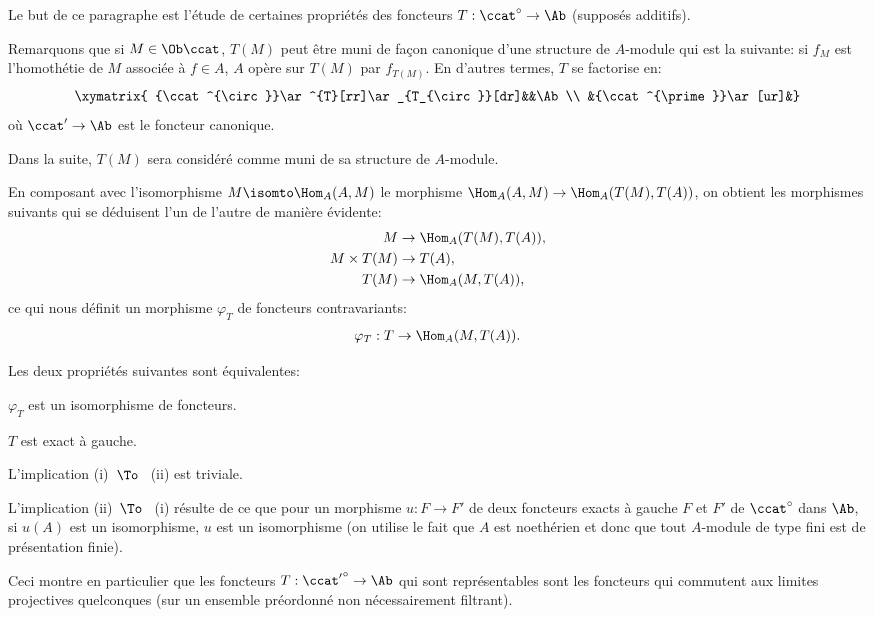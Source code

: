 \smallskip
Le but de ce paragraphe est l'\'etude de certaines propri\'et\'es des foncteurs \hbox{$T: \ccat^{\circ}\to \Ab$} (suppos\'es additifs).

Remarquons que si $M\in \Ob \ccat$, $T(M)$ peut \^etre muni de fa\c
con canonique d'une structure de $A$-module qui est la suivante:
si $f_{M}$ est l'homoth\'etie de $M$ associ\'ee \`a $f\in A$, $A$
op\`ere sur $T(M)$ par $f_{T(M)}$. En d'autres termes, $T$ se
factorise en:
$$
\xymatrix{ {\ccat^{\circ}}\ar^{T}[rr]\ar_{T_{\circ}}[dr]&&\Ab\\
&{\ccat^{\prime}}\ar[ur]&}
$$
o\`u $\ccat'\to \Ab$ est le foncteur canonique.

Dans la suite, $T(M)$ sera consid\'er\'e comme muni de sa structure de $A$-module.

En composant avec l'isomorphisme \hbox{$M\isomto \Hom_{A}(A, M)$} le morphisme $\Hom_{A}(A, M)\to \Hom_{A}(T(M), T(A))$, on obtient les morphismes suivants qui se d\'eduisent l'un de l'autre de mani\`ere \'evidente:
\begin{align*}
M&\to \Hom_{A}(T(M), T(A)),\\
M\times T(M)&\to T(A),\\
T(M)&\to \Hom_{A}(M, T(A)),
\end{align*}
ce qui nous d\'efinit un morphisme $\varphi_{T}$ de foncteurs contravariants:
\begin{eqnarray*}
\varphi_{T}: T\to \Hom_{A}(M, T(A)).
\end{eqnarray*}

\begin{proposition} \label{IV.1.1}
Les deux propri\'et\'es suivantes sont \'equivalentes:
\begin{enumeratei}
\item
$\varphi_{T}$ est un isomorphisme de foncteurs.

\item
$T$ est exact \`a gauche.
\end{enumeratei}
\end{proposition}

L'implication (i)~$\To$~ (ii) est triviale.

L'implication (ii)~$\To$~ (i) r\'esulte de ce que pour un morphisme $u:F\to F'$ de deux foncteurs \ignorespaces exacts \`a gauche $F$ et $F'$ de $\ccat^{\circ}$ dans $\Ab$, si $u(A)$ est un isomorphisme, $u$ est un isomorphisme (on utilise le fait que $A$ est noeth\'erien et donc que tout $A$-module de type fini est de pr\'esentation finie).

\begin{remarque} \label{IV.1.2}
Ceci montre en particulier que les foncteurs $T:{\ccat'}^{\circ}\to \Ab$ qui sont repr\'esentables sont les foncteurs qui commutent aux limites projectives quelconques (sur un ensemble pr\'eordonn\'e non n\'ecessairement filtrant).
\end{remarque}

